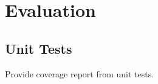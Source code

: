 \documentclass{standalone}
\begin{document}
	\section{Evaluation}
		\subsection{Unit Tests}
			Provide coverage report from unit tests.
\end{document}
